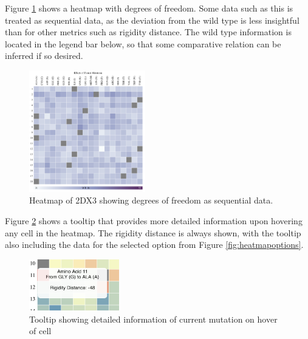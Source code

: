 \documentclass[11pt]{IEEEtran}
\begin{document}
Figure \ref{fig:heatmapseq} shows a heatmap with degrees of freedom. Some data such as this is treated as sequential data, as the deviation from the wild type is less insightful than for other metrics such as rigidity distance. The wild type information is located in the legend bar below, so that some comparative relation can be inferred if so desired.\\
\begin{figure}[ht]
  \center
  \includegraphics[width=0.45\textwidth]{figs/heatmap_sequential.png}
  \caption{Heatmap of 2DX3 showing degrees of freedom as sequential data.}
  \label{fig:heatmapseq}
\end{figure}

Figure \ref{fig:heatmaptooltip} shows a tooltip that provides more detailed information upon hovering any cell in the heatmap. The rigidity distance is always shown, with the tooltip also including the data for the selected option from Figure \ref{fig:heatmapoptions}.
\begin{figure}[ht]
  \center
  \includegraphics[width=0.35\textwidth]{figs/heatmap_tooltip.png}
  \caption{Tooltip showing detailed information of current mutation on hover of cell}
  \label{fig:heatmaptooltip}
\end{figure}
\end{document}
